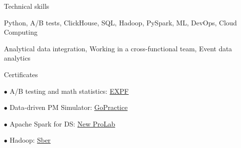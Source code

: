 \documentclass{resume} %
\begin{document}
    
\begin{rSection}{ Technical skills }
    
    Python, A/B tests, ClickHouse, SQL, Hadoop, PySpark, ML, DevOps, Cloud Computing
    
    Analytical data integration, Working in a cross-functional team, Event data analytics 

\end{rSection}

\begin{rSection}{ Certificates }
    
    \begin{multicols}{2}[]

    $\bullet$ A/B testing and math statistics:
    \href{https://cloud.mail.ru/public/WhV5/7Ua4yoKkW}{EXPF}
    
    $\bullet$ Data-driven PM Simulator: \href{https://gopractice.ru/course/pm/certificate/juqpip7o}{GoPractice}
    
    $\bullet$ Apache Spark for DS: \href{https://cloud.mail.ru/public/SQAS/RrvheyFmY}{New ProLab} 
    
    $\bullet$ Hadoop: \href{https://cloud.mail.ru/public/CH8T/6mMgjbRMZ}{Sber}
    
    \end{multicols}

\end{rSection}
\end{document}
